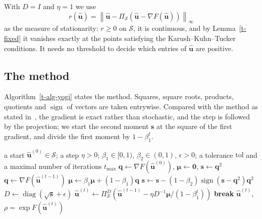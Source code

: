 \documentclass[11pt]{article}
\theoremstyle{plain}
\theoremstyle{remark}
\numberwithin{equation}{section}
\begin{document}
With $D=I$ and $\eta=1$ we use
\begin{equation}\label{t-r}
r\left(\widehat{\bm u}\right)=\left\|\widehat{\bm u}-\Pi_{\mathcal{S}}\left(\widehat{\bm u}-\nabla F\left(\widehat{\bm u}\right)\right)\right\|_\infty
\end{equation}
as the measure of stationarity: $r\ge 0$ on $\mathcal{S}$, it is continuous,
and by Lemma~\ref{t-fixed} it vanishes exactly at the points satisfying
the Karush--Kuhn--Tucker conditions. It needs no threshold to decide which
entries of $\widehat{\bm u}$ are positive.

\subsection{The method}

Algorithm~\ref{t-alg-yogi} states the method. Squares, square roots, products,
quotients and $\operatorname{sign}$ of vectors are taken entrywise. Compared
with the method as stated in~\cite{2018Zaheer_Yogi}, the gradient is exact
rather than stochastic, and the step is followed by the projection; we start
the second moment $\bm s$ at the square of the first gradient, and divide the
first moment by $1-\beta_1^t$.

\begin{algorithm}[ht]
\caption{Projected Yogi}\label{t-alg-yogi}
\begin{algorithmic}[1]
\Require a start $\widehat{\bm u}^{(0)}\in\mathcal{S}$; a step $\eta>0$;
$\beta_1\in[0,1)$, $\beta_2\in(0,1)$, $\epsilon>0$; a tolerance $\mathrm{tol}$
and a maximal number of iterations $t_{\max}$
\State $\bm q\gets\nabla F\left(\widehat{\bm u}^{(0)}\right)$, $\bm \mu\gets\bm 0$, $\bm s\gets\bm q^2$
  \State $\bm q\gets\nabla F\left(\widehat{\bm u}^{(t-1)}\right)$
  \State $\bm\mu\gets\beta_1\bm\mu+(1-\beta_1)\bm q$
  \State $\bm s\gets\bm s-(1-\beta_2)\operatorname{sign}\left(\bm s-\bm q^2\right)\bm q^2$
  \State $D\gets\operatorname{diag}\left(\sqrt{\bm s}+\epsilon\right)$
  \State $\widehat{\bm u}^{(t)}\gets\Pi^D_{\mathcal{S}}\left(\widehat{\bm u}^{(t-1)}-\eta D^{-1}\bm\mu/\left(1-\beta_1^t\right)\right)$
    \State \textbf{break}
  \EndIf
\EndFor
\State \Return $\widehat{\bm u}^{(t)}$, $\rho=\exp F\left(\widehat{\bm u}^{(t)}\right)$
\end{algorithmic}
\end{algorithm}
\end{document}
